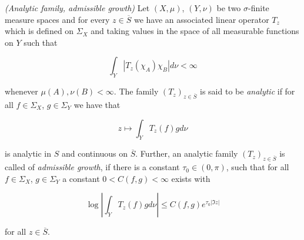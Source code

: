 \begin{mdframed}
	\begin{definition}\emph{(Analytic family, admissible growth)}
		Let $(X,\mu)$, $(Y,\nu)$ be two $\sigma$-finite measure spaces and for every $z \in \overline{S}$ we have an associated linear operator $T_z$ which is defined on $\Sigma_X$ and taking values in the space of all measurable functions on $Y$ such that

		\begin{equation*}
			\int_Y \left| T_z(\chi_A)\chi_B \right| d\nu < \infty
		\end{equation*}

		whenever $\mu(A),\nu(B) < \infty$. The family $\left( T_z \right)_{z \in \overline{S}}$ is said to be \emph{analytic} if for all $f \in \Sigma_X$, $g \in \Sigma_Y$ we have that

		\begin{equation*}
			z \mapsto \int_Y T_z(f)gd\nu
		\end{equation*}

		is analytic in $S$ and continuous on $\overline{S}$. Further, an analytic family $\left( T_z \right)_{z \in \overline{S}}$ is called of \emph{admissible growth}, if there is a constant $\tau_0 \in (0,\pi)$, such that for all $f \in \Sigma_X$, $g \in \Sigma_Y$ a constant $0 < C(f,g) < \infty$ exists with

			\begin{equation*}
				\log\left| \int_Y T_z(f) g d\nu\right| \leqslant C(f,g)e^{\tau_0\left| \Im z\right|}
			\end{equation*}

			for all $z \in \overline{S}$.
	\end{definition}
\end{mdframed}

\vspace{2mm}

